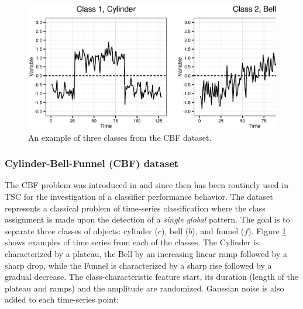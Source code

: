 \begin{figure}[t]
   \centering
   \includegraphics[width=140mm]{figures/cbf.ps}
   \caption{An example of three classes from the CBF dataset.}
   \label{fig:cbf}
\end{figure}

\subsubsection{Cylinder-Bell-Funnel (CBF) dataset}
The CBF problem was introduced in \cite{cbf} and since then has been routinely used in TSC for the investigation 
of a classifier performance behavior.
The dataset represents a classical problem of time-series classification where the class assignment is made upon the 
detection of a \textit{single global} pattern. 
The goal is to separate three classes of objects: cylinder ($c$), bell ($b$), and funnel ($f$).  Figure \ref{fig:cbf} 
shows examples of time series from each of the classes. 
The Cylinder is characterized by a plateau, the Bell by an increasing linear ramp followed by a sharp drop, 
while the Funnel is characterized by a sharp rise followed by a gradual decrease. 
The class-characteristic feature start, its duration (length of the plateau and ramps) and the amplitude are randomized. 
Gaussian noise is also added to each time-series point:


